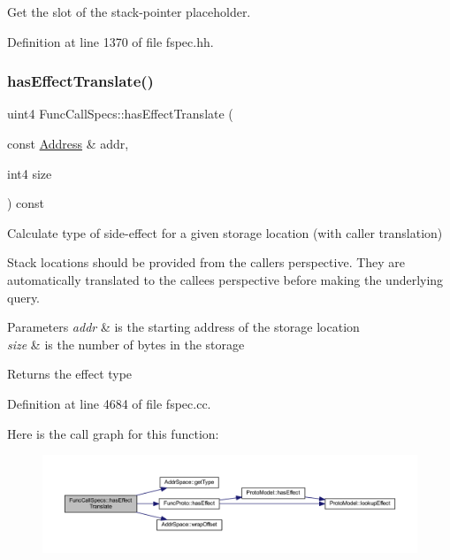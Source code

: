 Get the slot of the stack-\/pointer placeholder. 



Definition at line 1370 of file fspec.\+hh.

\mbox{\label{class_func_call_specs_a37a11cd8c631ed5b643eaf259b2ae49b}} 
\subsubsection{\texorpdfstring{hasEffectTranslate()}{hasEffectTranslate()}}
{\footnotesize\ttfamily uint4 Func\+Call\+Specs\+::has\+Effect\+Translate (\begin{DoxyParamCaption}\item[{const \mbox{\hyperlink{class_address}{Address}} \&}]{addr,  }\item[{int4}]{size }\end{DoxyParamCaption}) const}



Calculate type of side-\/effect for a given storage location (with caller translation) 

Stack locations should be provided from the caller\textquotesingle{}s perspective. They are automatically translated to the callee\textquotesingle{}s perspective before making the underlying query. 
\begin{DoxyParams}{Parameters}
{\em addr} & is the starting address of the storage location \\
\hline
{\em size} & is the number of bytes in the storage \\
\hline
\end{DoxyParams}
\begin{DoxyReturn}{Returns}
the effect type 
\end{DoxyReturn}


Definition at line 4684 of file fspec.\+cc.

Here is the call graph for this function\+:
\nopagebreak
\begin{figure}[H]
\begin{center}
\leavevmode
\includegraphics[width=350pt]{class_func_call_specs_a37a11cd8c631ed5b643eaf259b2ae49b_cgraph}
\end{center}
\end{figure}
\mbox{\label{class_func_call_specs_a0b481b6be0cc41e4f1b35089fc5f192b}} 
